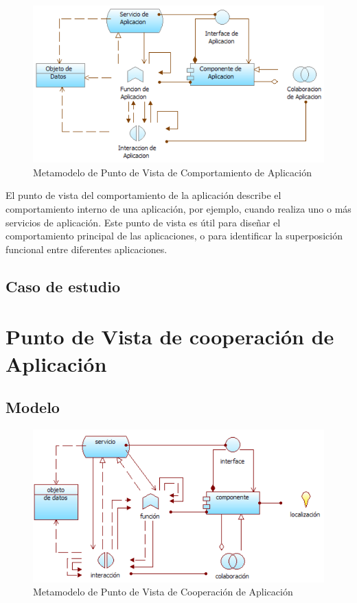 \begin{figure}[th!]
	\centering
	\includegraphics[width=0.6\linewidth]{arquitectura/imagenes/modeloComportamientoAplicacion}
	\caption{Metamodelo de Punto de Vista de Comportamiento de Aplicación \cite{pun7}}
	\label{fig:metamodelo de punto de vista de comportamiento de aplicación}
\end{figure}
El punto de vista del comportamiento de la aplicación describe el comportamiento interno de una aplicación, por ejemplo, cuando realiza uno o más servicios de aplicación. Este punto de vista es útil para diseñar el comportamiento principal de las aplicaciones, o para identificar la superposición funcional entre diferentes aplicaciones.

\subsection{Caso de estudio}

\newpage

\section{Punto de Vista de cooperación de Aplicación}

\subsection{Modelo}

\begin{figure}[th!]
	\centering
	\includegraphics[width=0.7\linewidth]{arquitectura/imagenes/modeloCooperacionAplicacion}
	\caption{Metamodelo de Punto de Vista de Cooperación de Aplicación \cite{pun8}}
	\label{fig:metamodelo de punto de vista de cooperación de aplicación}
\end{figure}

